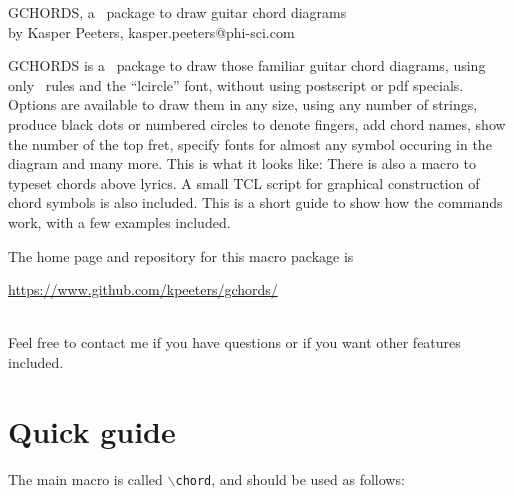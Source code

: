 \documentclass{article}
\begin{document}
\begin{center}
{\Large GCHORDS, a \LaTeXe\ package to draw guitar chord diagrams}\\
\vskip 0.2cm
{\large by Kasper Peeters, kasper.peeters@phi-sci.com}
\end{center}
\vskip 4cm

GCHORDS is a \LaTeXe\ package to draw those familiar guitar chord
diagrams, using only \LaTeXe\ rules and the ``lcircle'' font, without
using postscript or pdf specials. Options are available to draw them
in any size, using any number of strings, produce black dots or
numbered circles to denote fingers, add chord names, show the number
of the top fret, specify fonts for almost any symbol occuring in the
diagram and many more. This is what it looks like:
There is also a macro to typeset chords above lyrics. A small
TCL script for graphical construction of chord symbols is also
included.  This is a short guide to show how the commands work, with a
few examples included. 
\medskip

\noindent The home page and repository for this macro package is\\[1ex]
\centerline{\url{https://www.github.com/kpeeters/gchords/}}\\

\noindent Feel free to contact me if you have questions or if you want
other features included.

\renewcommand\topfretsiz{3pt}

\section{Quick guide}

The main macro is called {\tt$\backslash$chord}, and should be used as follows:
\end{document}
